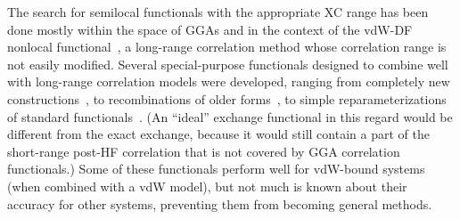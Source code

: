 The search for semilocal functionals with the appropriate XC range has been done mostly within the space of GGAs and in the context of the vdW-DF nonlocal functional~\cite{DionPRL04,LeePRB10,MurrayJCTC09}, a long-range correlation method whose correlation range is not easily modified.
Several special-purpose functionals designed to combine well with long-range correlation models were developed, ranging from completely new constructions~\cite{PernalPRL09,WellendorffPRB12}, to recombinations of older forms~\cite{CooperPRB10,HamadaPRB14,BerlandPRB14}, to simple reparameterizations of standard functionals~\cite{ZhangPRL98,KlimesJPCM10,KlimesPRB11}.
(An ``ideal'' exchange functional in this regard would be different from the exact exchange, because it would still contain a part of the short-range post-HF correlation that is not covered by GGA correlation functionals.)
Some of these functionals perform well for vdW-bound systems (when combined with a vdW model), but not much is known about their accuracy for other systems, preventing them from becoming general methods.

